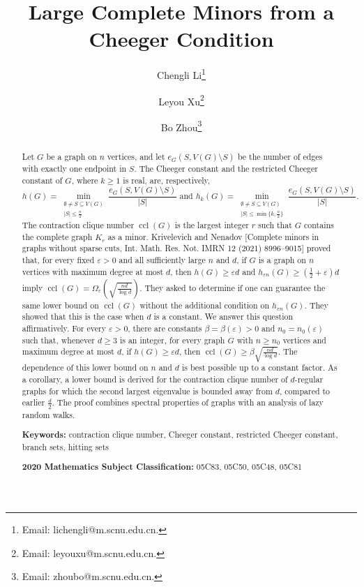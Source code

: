 \documentclass[11pt,a4paper]{article}
\theoremstyle{definition}
\theoremstyle{remark}
\DeclareMathOperator{\ccl}{ccl}
\newcommand{\eps}{\varepsilon}
\begin{document}
\title{\bf Large Complete Minors from a Cheeger Condition}

\author[1]{Chengli Li\thanks{Email: lichengli@m.scnu.edu.cn.}}
\author[2]{Leyou Xu\thanks{Email: leyouxu@m.scnu.edu.cn.}}
\author[1]{Bo Zhou\thanks{Email: zhoubo@m.scnu.edu.cn.}}
\date{}
\maketitle

\begin{abstract}
Let $G$ be a graph on $n$ vertices, and let
$e_G(S,V(G)\setminus S)$ be the number of edges with exactly one
endpoint in $S$. The Cheeger constant and the restricted Cheeger
constant of $G$, where $k\ge1$ is real, are, respectively,
\[
 h(G)=\min_{\substack{\emptyset\ne S\subseteq V(G)\\|S|\le \frac{n}{2}}}
 \frac{e_G(S,V(G)\setminus S)}{|S|}
  \text{ and } 
 h_k(G)=\min_{\substack{\emptyset\ne S\subseteq V(G)\\
 |S|\le\min\{k,\frac{n}{2}\}}}
 \frac{e_G(S,V(G)\setminus S)}{|S|}.
\]
The contraction clique number $\ccl(G)$ is the largest integer $r$
such that $G$ contains the complete graph $K_r$ as a minor.
Krivelevich and Nenadov [Complete minors in graphs without sparse
cuts, Int. Math. Res. Not. IMRN 12 (2021) 8996--9015] proved
that, for every fixed $\eps>0$ and all sufficiently large $n$ and $d$, if $G$ is a graph on $n$ vertices with maximum degree at most $d$, then $h(G)\ge\eps d$ and
$h_{\eps n}(G)\ge(\frac{1}{2}+\eps)d$ imply
$\ccl(G)=\Omega_\eps(\sqrt{\frac{nd}{\log d}})$. They asked to determine if one can guarantee the same lower bound on $\ccl(G)$ without the additional
condition on $h_{\eps n}(G)$. They showed that this is the case when $d$ is a constant. We answer this question
affirmatively. For every $\eps>0$, there are constants
$\beta=\beta(\eps)>0$ and $n_0=n_0(\eps)$ such that, whenever
$d\ge 3$ is an integer, for every graph $G$ with
$n\ge n_0$ vertices and maximum degree at most $d$, if $h(G)\ge\eps d$, then
$\ccl(G)\ge\beta\sqrt{\frac{nd}{\log d}}$. The dependence of this lower bound on $n$ and $d$ is best possible up to a constant factor. As a corollary, a lower bound is derived for the contraction clique number of $d$-regular graphs for which the second largest eigenvalue is bounded away from $d$, compared to earlier $\frac{d}{2}$. 
The proof combines spectral properties of graphs with an analysis of lazy random walks.

\smallskip
\noindent\textbf{Keywords:}  contraction clique number, Cheeger constant, restricted Cheeger constant, branch sets, hitting sets

\noindent\textbf{2020 Mathematics Subject Classification:} 05C83, 05C50, 05C48, 05C81
\end{abstract}
\end{document}
